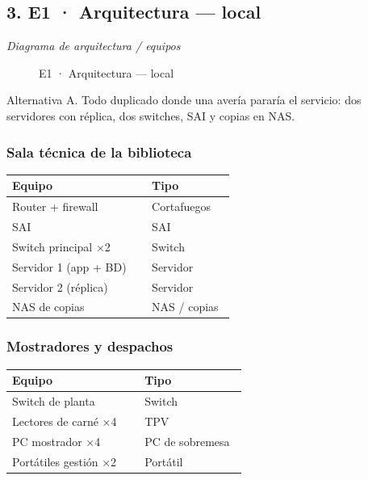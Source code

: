 \subsection*{3. E1 · Arquitectura — local}

\emph{Diagrama de arquitectura / equipos}

\begin{figure}[H]
\centering
{}
\caption{E1 · Arquitectura — local}
\end{figure}

Alternativa A. Todo duplicado donde una avería pararía el servicio: dos servidores con réplica, dos switches, SAI y copias en NAS.

\subsubsection*{Sala técnica de la biblioteca}

{\small
\begin{longtable}{@{}>{\raggedright\arraybackslash}p{0.596\linewidth}>{\raggedright\arraybackslash}p{0.353\linewidth}@{}}
\toprule
\textbf{Equipo} & \textbf{Tipo} \\
\midrule
\endhead
Router + firewall & Cortafuegos \\
SAI & SAI \\
Switch principal ×2 & Switch \\
Servidor 1 (app + BD) & Servidor \\
Servidor 2 (réplica) & Servidor \\
NAS de copias & NAS / copias \\
\bottomrule
\end{longtable}}

\subsubsection*{Mostradores y despachos}

{\small
\begin{longtable}{@{}>{\raggedright\arraybackslash}p{0.534\linewidth}>{\raggedright\arraybackslash}p{0.415\linewidth}@{}}
\toprule
\textbf{Equipo} & \textbf{Tipo} \\
\midrule
\endhead
Switch de planta & Switch \\
Lectores de carné ×4 & TPV \\
PC mostrador ×4 & PC de sobremesa \\
Portátiles gestión ×2 & Portátil \\
\bottomrule
\end{longtable}}

